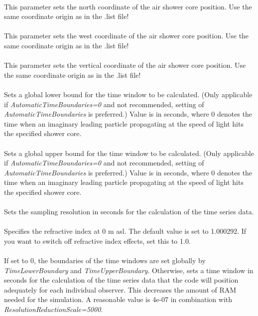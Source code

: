 \documentclass[a4paper,10pt]{article}
\begin{document}
\\
This parameter sets the north coordinate of the air shower core position. Use the same coordinate origin as in the .list file!\\

\\
This parameter sets the west coordinate of the air shower core position. Use the same coordinate origin as in the .list file!\\

\\
This parameter sets the vertical coordinate of the air shower core position. Use the same coordinate origin as in the .list file!\\

\\
Sets a global lower bound for the time window to be calculated. (Only applicable if {\it AutomaticTimeBoundaries=0} and not recommended, setting of {\it AutomaticTimeBoundaries} is preferred.) Value is in seconds, where 0 denotes the time when an imaginary leading particle propagating at the speed of light hits the specified shower core.\\

\\
Sets a global upper bound for the time window to be calculated. (Only applicable if {\it AutomaticTimeBoundaries=0} and not recommended, setting of {\it AutomaticTimeBoundaries} is preferred.) Value is in seconds, where 0 denotes the time when an imaginary leading particle propagating at the speed of light hits the specified shower core.\\

\\
Sets the sampling resolution in seconds for the calculation of the time series data.\\

\\
Specifies the refractive index at 0 m asl. The default value is set to 1.000292. If you want to switch off refractive index effects, set this to 1.0.\\

\\
If set to 0, the boundaries of the time windows are set globally by {\it TimeLowerBoundary} and {\it TimeUpperBoundary}. Otherwise, sets a time window in seconds for the calculation of the time series data that the code will position adequately for each individual observer. This decreases the amount of RAM needed for the simulation. A reasonable value is 4e-07 in combination with {\it ResolutionReductionScale=5000}.\\
\end{document}
